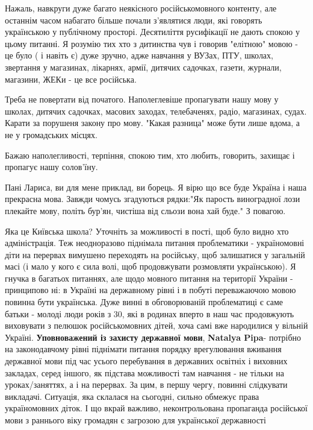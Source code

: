 \begin{itemize}
Нажаль, навкруги дуже багато неякісного російськомовного контенту, але останнім
часом набагато більше почали з'являтися люди, які говорять українською у
публічному просторі. Десятиліття русифікації не дають спокою у цьому питанні. Я
розумію тих хто з дитинства чув і говорив "елітною" мовою - це було ( і навіть
є) дуже зручно, адже навчання у ВУЗах, ПТУ, школах, звертання у магазинах,
лікарнях, армії, дитячих садочках, газети, журнали, магазини, ЖЕКи - це все
російська.

Треба не повертати від початого. Наполеглевіше пропагувати нашу мову у школах,
дитячих садочках, масових заходах, телебаченях, радіо, магазинах, судах. Карати
за порушеня закону про мову. "Какая разница" може бути лише вдома, а не у
громадських місцях.

Бажаю наполегливості, терпіння, спокою тим, хто любить, говорить, захищає і
пропагує нашу солов'їну.

 

Пані Лариса, ви для мене приклад, ви борець. Я вірю що все буде Україна і наша
прекрасна мова. Завжди чомусь згадуються рядки:"Як парость виноградної лози
плекайте мову, політь бур'ян, чистіша від сльози вона хай буде." З повагою.


 

Яка це Київська школа? Уточніть за можливості в пості, щоб було видно хто
адміністрація. Теж неодноразово піднімала питання проблематики - україномовні
діти на перервах вимушено переходять на російську, щоб залишатися у загальній
масі (і мало у кого є сила волі, щоб продовжувати розмовляти українською). Я
гнучка в багатьох питаннях, але щодо мовного питання на території України -
принципово ні: в Україні на державному рівні і в побуті переважаючою мовою
повинна бути українська. Дуже винні в обговорюваній проблематиці є саме батьки
- молоді люди років з 30, які в родинах вперто в наш час продовжують виховувати
з пелюшок російськомовних дітей, хоча самі вже народилися у вільній Україні.
\textbf{Уповноважений із захисту державної мови}, \textbf{Natalya Pipa}- потрібно на
законодавчому рівні піднімати питання порядку врегулювання вживання державної
мови під час усього перебування в державних освітніх і виховних закладах, серед
іншого, як підстава можливості там навчання - не тільки на уроках/заняттях, а і
на перервах. За цим, в першу чергу, повинні слідкувати викладачі. Ситуація, яка
склалася на сьогодні, сильно обмежує права україномовних діток. І що вкрай
важливо, неконтрольована пропаганда російської мови з раннього віку громадян є
загрозою для української державності


\end{itemize}
